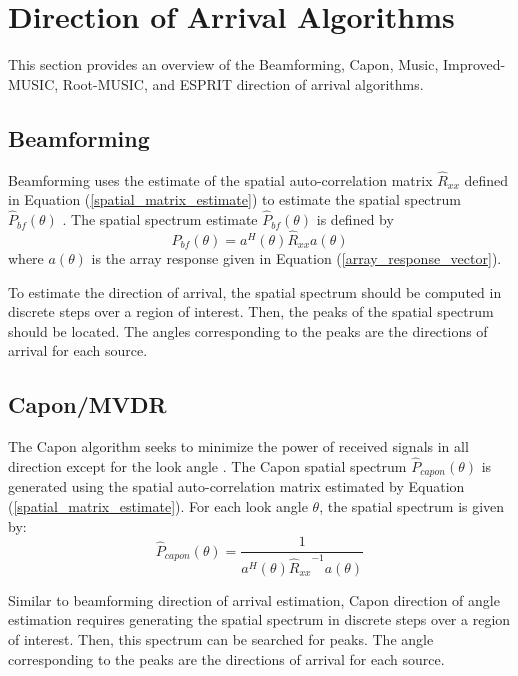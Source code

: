 \documentclass[conference]{IEEEtran}
\begin{document}
	\section{Direction of Arrival Algorithms}
	
	This section provides an overview of the Beamforming, Capon, Music, Improved-MUSIC, Root-MUSIC, and ESPRIT direction of arrival algorithms.
	
	\subsection{Beamforming}
	
		Beamforming uses the estimate of the spatial auto-correlation matrix $\hat{R}_{xx}$ defined in Equation (\ref{spatial_matrix_estimate}) to estimate the spatial spectrum $\hat{P}_{bf}(\theta)$ \cite{doa_algorithms_raghu}. The spatial spectrum estimate $\hat{P}_{bf}(\theta)$ is defined by
		\begin{equation}
			\hat{P}_{bf}(\theta) = a^H(\theta)\hat{R}_{xx}a(\theta)
		\end{equation}
		where $a(\theta)$ is the array response given in Equation (\ref{array_response_vector}).
		
		To estimate the direction of arrival, the spatial spectrum should be computed in discrete steps over a region of interest. Then, the peaks of the spatial spectrum should be located. The angles corresponding to the peaks are the directions of arrival for each source.
		
	\subsection{Capon/MVDR}
	
		The Capon algorithm seeks to minimize the power of received signals in all direction except for the look angle \cite{doa_algorithms_raghu}. The Capon spatial spectrum $\hat{P}_{capon}(\theta)$ is generated using  the spatial auto-correlation matrix estimated by Equation (\ref{spatial_matrix_estimate}). For each look angle $\theta$, the spatial spectrum is given by:
	\begin{equation}
		\hat{P}_{capon}(\theta) = \frac{1}{a^H(\theta){\hat{R}_{xx}}^{-1}a(\theta)}
	\end{equation}
	
		Similar to beamforming direction of arrival estimation, Capon direction of angle estimation requires generating the spatial spectrum in discrete steps over a region of interest. Then, this spectrum can be searched for peaks. The angle corresponding to the peaks are the directions of arrival for each source.
	
\end{document}
